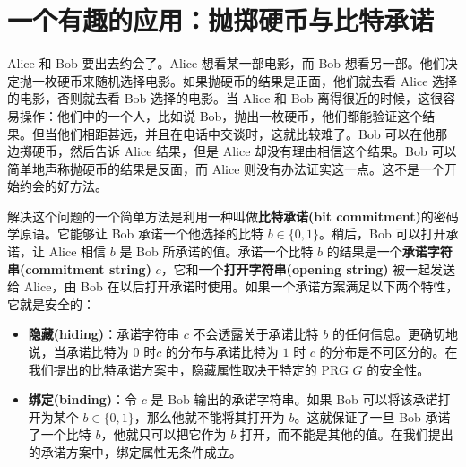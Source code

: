 \section{一个有趣的应用：抛掷硬币与比特承诺}

Alice 和 Bob 要出去约会了。Alice 想看某一部电影，而 Bob 想看另一部。他们决定抛一枚硬币来随机选择电影。如果抛硬币的结果是正面，他们就去看 Alice 选择的电影，否则就去看 Bob 选择的电影。当 Alice 和 Bob 离得很近的时候，这很容易操作：他们中的一个人，比如说 Bob，抛出一枚硬币，他们都能验证这个结果。但当他们相距甚远，并且在电话中交谈时，这就比较难了。Bob 可以在他那边掷硬币，然后告诉 Alice 结果，但是 Alice 却没有理由相信这个结果。Bob 可以简单地声称抛硬币的结果是反面，而 Alice 则没有办法证实这一点。这不是一个开始约会的好方法。

解决这个问题的一个简单方法是利用一种叫做\textbf{比特承诺(bit commitment)}的密码学原语。它能够让 Bob 承诺一个他选择的比特 $b\in\{0,1\}$。稍后，Bob 可以打开承诺，让 Alice 相信 $b$ 是 Bob 所承诺的值。承诺一个比特 $b$ 的结果是一个\textbf{承诺字符串(commitment string)} $c$，它和一个\textbf{打开字符串(opening string)} 被一起发送给 Alice，由 Bob 在以后打开承诺时使用。如果一个承诺方案满足以下两个特性，它就是安全的：
\begin{itemize}
	\item \textbf{隐藏(hiding)}：承诺字符串 $c$ 不会透露关于承诺比特 $b$ 的任何信息。更确切地说，当承诺比特为 $0$ 时$c$ 的分布与承诺比特为 $1$ 时 $c$ 的分布是不可区分的。在我们提出的比特承诺方案中，隐藏属性取决于特定的 PRG $G$ 的安全性。
	\item \textbf{绑定(binding)}：令 $c$ 是 Bob 输出的承诺字符串。如果 Bob 可以将该承诺打开为某个 $b\in\{0,1\}$，那么他就不能将其打开为 $\bar{b}$。这就保证了一旦 Bob 承诺了一个比特 $b$，他就只可以把它作为 $b$ 打开，而不能是其他的值。在我们提出的承诺方案中，绑定属性无条件成立。
\end{itemize}

